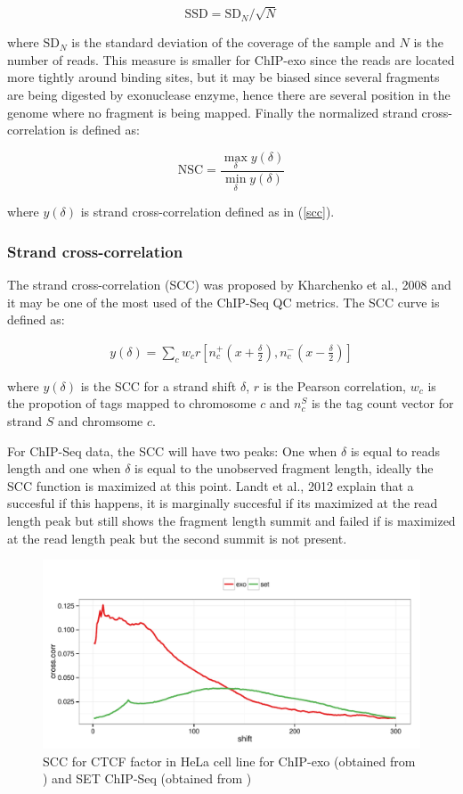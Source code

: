 \documentclass[11pt]{article}\usepackage[]{graphicx}\usepackage[]{color}
\begin{document}
\[
\mbox{SSD} = \mbox{SD}_N / \sqrt{N} 
\]

where $\mbox{SD}_N$ is the standard deviation of the coverage of the
sample and $N$ is the number of reads. This measure is smaller for
ChIP-exo since the reads are located more tightly around binding
sites, but it may be biased since several fragments are being
digested by exonuclease enzyme, hence there are several position in
the genome where no fragment is being mapped. Finally the normalized
strand cross-correlation is defined as:

\[
\mbox{NSC} = \frac{ \max_\delta y(\delta)}{\min_\delta y(\delta)}
\]

where $y(\delta)$ is strand cross-correlation defined as in (\ref{scc}). 

\subsubsection{Strand cross-correlation}
\label{sec:scc}

The strand cross-correlation (SCC) was proposed by Kharchenko et al.,
2008 \cite{strandcc} and it may be one of the most used of the
ChIP-Seq QC metrics. The SCC curve is defined as:

\begin{align}
  y(\delta) = \sum_c w_c r\left[ n_c^+ \left(x + \frac{\delta}{2}
    \right), n_c^- \left( x- \frac{\delta}{2} \right)\right]
\label{scc}
\end{align}

where $y(\delta)$ is the SCC for a strand shift $\delta$, $r$ is the
Pearson correlation, $w_c$ is the propotion of tags mapped to
chromosome $c$ and $n_c^S$ is the tag count vector for strand $S$ and
chromsome $c$.

For ChIP-Seq data, the SCC will have two peaks: One when $\delta$ is
equal to reads length and one when $\delta$ is equal to the unobserved
fragment length, ideally the SCC function is maximized at this
point. Landt et al., 2012 \cite{encode_qc} explain that a succesful if
this happens, it is marginally succesful if its maximized at the read
length peak but still shows the fragment length summit and failed if
is maximized at the read length peak but the second summit is not
present. 

\begin{figure}[H]
  \centering  
\includegraphics[width = .7\textwidth]{../figs/for_paper/scc_ctcf.pdf}
  \caption{SCC for CTCF factor in HeLa cell line for ChIP-exo (obtained from \cite{exo1}) and SET ChIP-Seq (obtained from \cite{encode1}) }
  \label{fig:scc}
\end{figure}
\end{document}
